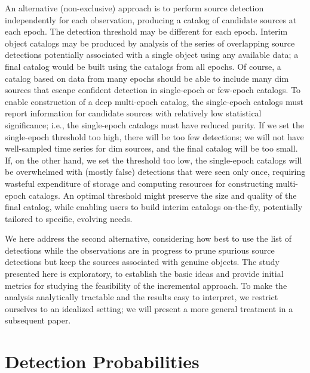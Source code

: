 \documentclass[twocolumn]{emulateapj}
\begin{document}
An alternative (non-exclusive) approach is to perform source detection independently for each observation, producing a catalog of candidate sources at each epoch.
The detection threshold may be different for each epoch. 
Interim object catalogs may be produced by analysis of the series of overlapping source detections potentially associated with a single object using any available data; a final catalog would be built using the catalogs from all epochs.
Of course, a catalog based on data from many epochs should be able to include many dim sources that escape confident detection in single-epoch or few-epoch catalogs.
To enable construction of a deep multi-epoch catalog, the single-epoch catalogs must report information for candidate sources with relatively low statistical significance; i.e., the single-epoch catalogs must have reduced purity.
If we set the single-epoch threshold too high, there will be too few detections; we will not have well-sampled time series for dim sources, and the final catalog will be too small.
If, on the other hand, we set the threshold too low, the single-epoch catalogs will be overwhelmed with (mostly false) detections that were seen only once, requiring wasteful expenditure of storage and computing resources for constructing multi-epoch catalogs.
An optimal threshold might preserve the size and quality of the final catalog, while enabling users to build interim catalogs on-the-fly, potentially tailored to specific, evolving needs.

We here address the second alternative, considering how best to use the list of detections while the observations are in progress to prune spurious source detections but keep the sources associated with genuine objects.
The study presented here is exploratory, to establish the basic ideas and provide initial metrics for studying the feasibility of the incremental approach.
To make the analysis analytically tractable and the results easy to interpret, we restrict ourselves to an idealized setting; we will present a more general treatment in a subsequent paper.

\section{Detection Probabilities} 
\label{sec:det}

\noindent 
\end{document}
